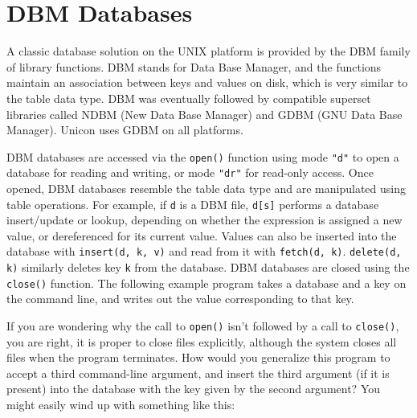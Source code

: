 \section{DBM Databases}

A classic database solution on the UNIX platform is provided by the DBM
family of library functions. DBM stands for Data Base
Manager, and the functions maintain an association between keys and
values on disk, which is very similar to the table data type. DBM was
eventually followed by compatible superset libraries called NDBM (New
Data Base Manager) and GDBM (GNU Data Base Manager). Unicon uses GDBM
on all platforms.

DBM databases are accessed via the \texttt{open()} function using mode
\texttt{"d"} to open a database for reading and writing, or mode
\texttt{"dr"} for read-only access. Once opened, DBM databases
resemble the table data type and are manipulated using table
operations. For example, if \texttt{d} is a DBM file,
\texttt{d[s]} performs a database
insert/update or lookup, depending on whether the expression is
assigned a new value, or dereferenced for its
current value. Values can also be
inserted into the database with \texttt{insert(d, k, v)} and read from it with
\texttt{fetch(d, k)}. \texttt{delete(d, k)} similarly deletes key \texttt{k} from
the database. DBM databases are closed using the \texttt{close()}
function. The following example program takes a database and a key on
the command line, and writes out the value corresponding to that key.


If you are wondering why the call to \texttt{open()}
isn't followed by a call to \texttt{close()}, you are
right, it is proper to close files explicitly, although the system
closes all files when the program terminates. How would you generalize
this program to accept a third command-line argument, and insert the
third argument (if it is present) into the database with the key given
by the second argument? You might easily wind up with something like
this:


